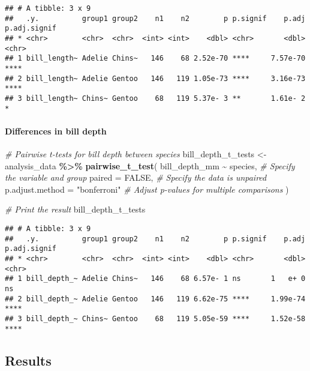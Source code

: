 \documentclass[
]{article}
\newenvironment{Shaded}{\begin{snugshade}}{\end{snugshade}}
\newcommand{\AttributeTok}[1]{\textcolor[rgb]{0.13,0.29,0.53}{#1}}
\newcommand{\CommentTok}[1]{\textcolor[rgb]{0.56,0.35,0.01}{\textit{#1}}}
\newcommand{\ConstantTok}[1]{\textcolor[rgb]{0.56,0.35,0.01}{#1}}
\newcommand{\FunctionTok}[1]{\textcolor[rgb]{0.13,0.29,0.53}{\textbf{#1}}}
\newcommand{\NormalTok}[1]{#1}
\newcommand{\OtherTok}[1]{\textcolor[rgb]{0.56,0.35,0.01}{#1}}
\newcommand{\SpecialCharTok}[1]{\textcolor[rgb]{0.81,0.36,0.00}{\textbf{#1}}}
\newcommand{\StringTok}[1]{\textcolor[rgb]{0.31,0.60,0.02}{#1}}
\begin{document}
\begin{verbatim}
## # A tibble: 3 x 9
##   .y.          group1 group2    n1    n2        p p.signif    p.adj p.adj.signif
## * <chr>        <chr>  <chr>  <int> <int>    <dbl> <chr>       <dbl> <chr>       
## 1 bill_length~ Adelie Chins~   146    68 2.52e-70 ****     7.57e-70 ****        
## 2 bill_length~ Adelie Gentoo   146   119 1.05e-73 ****     3.16e-73 ****        
## 3 bill_length~ Chins~ Gentoo    68   119 5.37e- 3 **       1.61e- 2 *
\end{verbatim}

\paragraph{Differences in bill depth}\label{differences-in-bill-depth}

\begin{Shaded}
\begin{Highlighting}[]
\CommentTok{\# Pairwise t{-}tests for bill depth between species }
\NormalTok{bill\_depth\_t\_tests }\OtherTok{\textless{}{-}}\NormalTok{ analysis\_data }\SpecialCharTok{\%\textgreater{}\%}
  \FunctionTok{pairwise\_t\_test}\NormalTok{(}
\NormalTok{    bill\_depth\_mm }\SpecialCharTok{\textasciitilde{}}\NormalTok{ species,       }\CommentTok{\# Specify the variable and group}
    \AttributeTok{paired =} \ConstantTok{FALSE}\NormalTok{,                 }\CommentTok{\# Specify the data is unpaired}
    \AttributeTok{p.adjust.method =} \StringTok{"bonferroni"}  \CommentTok{\# Adjust p{-}values for multiple comparisons}
\NormalTok{  )}

\CommentTok{\# Print the result}
\NormalTok{bill\_depth\_t\_tests}
\end{Highlighting}
\end{Shaded}

\begin{verbatim}
## # A tibble: 3 x 9
##   .y.          group1 group2    n1    n2        p p.signif    p.adj p.adj.signif
## * <chr>        <chr>  <chr>  <int> <int>    <dbl> <chr>       <dbl> <chr>       
## 1 bill_depth_~ Adelie Chins~   146    68 6.57e- 1 ns       1   e+ 0 ns          
## 2 bill_depth_~ Adelie Gentoo   146   119 6.62e-75 ****     1.99e-74 ****        
## 3 bill_depth_~ Chins~ Gentoo    68   119 5.05e-59 ****     1.52e-58 ****
\end{verbatim}

\subsection{Results}\label{results}
\end{document}
